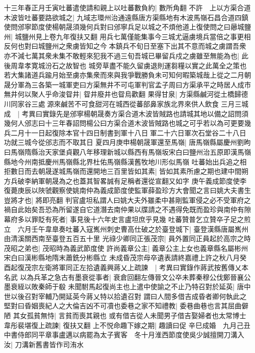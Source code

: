 十三年春正月壬寅吐蕃遣使請和親上以吐蕃數負約|{
	數所角翻}
不許　上以方渠合道木波皆吐蕃要路欲城之|{
	九域志環州治通遠縣唐方渠縣地有木波馬嶺石昌合道四鎮}
使問邠寧節度使楊朝晟須幾何兵對曰邠寧兵足以城之不煩他道上復使問之曰曏城鹽州|{
	城鹽州見上卷九年復扶又翻}
用兵七萬僅能集事今三城尤逼虜境兵當倍之事更相反何也對曰城鹽州之衆虜皆知之今本鎮兵不旬日至塞下出其不意而城之虜謂吾衆亦不減七萬其衆未集不敢輕來犯我不過三旬吾城已畢留兵戍之虜雖至無能為也|{
	此後周韋孝寛城汾石之故智也}
城旁草盡不能久留虜退則運芻糧以實之此萬全之策也若大集諸道兵踰月始至虜亦集衆而來與我爭戰勝負未可知何暇築城哉上從之二月朝晟分軍為三各築一城軍吏曰方渠無井不可屯軍判官孟子周曰方渠承平之時居人成市無井何以聚人乎命浚眢井|{
	眢井廢井也眢烏歡翻}
果得甘泉|{
	方渠縣鹹河從土橋歸德川同家谷三處源來鹹苦不可食甜河在城西從蕃部鼻家族北界來供人飲食}
三月三城成　|{
	考異曰實錄先是邠寧楊朝晟奏方渠合道木波皆賊路也請城其地以備之詔問須幾何人邠志曰十三年春詔問楊公曰方渠合道木波皆賊路也城之可乎若以為可更要幾兵二月十一日起復除本官十四日制書到軍十八日軍二十六日軍次石堂谷二十八日功就三城今從邠志而不取其日}
夏四月庚申楊朝晟軍還至馬嶺|{
	唐馬嶺縣屬慶州劉昫曰馬嶺隋縣治天家堡貞觀八年移理新城以縣西有馬嶺坂宋白曰鹽州治五原即漢馬嶺縣地今州南抵慶州馬嶺縣北界杜佑馬嶺縣漢舊牧地川形似馬嶺}
吐蕃始出兵追之相拒數日而去朝晟遂城馬嶺而還開地三百里皆如其素|{
	皆如其素所慮之期也建中間朔方兵破李納軍朝晟為之也蓋其智畧誠有足稱者還從宣翻又如字}
庚午義成節度使李復薨庚辰以陜虢觀察使姚南仲為義成節度使監軍薛盈珍方大會聞之言曰姚大夫書生豈將才也|{
	將即亮翻}
判官盧坦私謂人曰姚大夫外雖柔中甚剛監軍侵之必不受軍府之禍自此始矣吾恐為所留遂自它道潛去南仲果以牒請之不遇得免既而盈珍與南仲有隙幕府多以罪貶有死者|{
	事見後十六年史言盧坦庶乎見幾}
吐蕃贊普乞立贊卒子足之煎立　六月壬午韋臯奏吐蕃入寇嶲州刺史曹高仕破之於臺登城下|{
	臺登漢縣唐屬嶲州由清溪關西南至臺登五百五十里}
光祿少卿同正張茂宗|{
	員外置同正員起於高宗之時}
茂昭之弟也|{
	茂昭時為義武節度使}
許尚義章公主|{
	義章公主上女也義章縣名屬彬州宋白曰漢彬縣地隋末蕭銑分彬縣立}
未成昏茂宗母卒遺表請終嘉禮上許之秋八月癸酉起復茂宗左衛將軍同正左拾遺義興蔣乂上疏諫　|{
	考異曰實錄作蔣武按舊傳乂本名武}
以為兵革之急古有墨衰從事者|{
	衰倉回翻左傳晉文公卒未葬秦穆公伐鄭晉襄公墨衰絰以敗秦師于殽}
未聞駙馬起復尚主也上遣中使諭之不止乃特召對於延英|{
	唐中世以後召對宰輔乃開延英今蔣乂特以拾遺召對}
謂曰人間多借吉成昏者卿何執此之堅對曰昏姻喪紀人之大倫吉凶不可凟也委巷之家不知禮教|{
	委巷曲巷也言其屈曲僻陋}
其女孤貧無恃|{
	言貧而喪其親也}
或有借吉從人未聞男子借吉娶婦者也太常博士韋彤裴堪復上疏諫|{
	復扶又翻}
上不悦命趣下嫁之期|{
	趣讀曰促}
辛巳成婚　九月己丑中書侍郎同平章事盧邁以病罷為太子賓客　冬十月淮西節度使吳少誠擅開刀溝入汝|{
	刀溝新舊書皆作司洧水}
